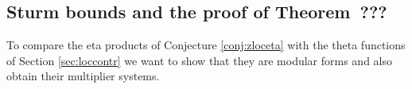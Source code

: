 \documentclass{article}
\theoremstyle{definition}
\begin{document}

\subsection{Sturm bounds and the proof of Theorem~???}
To compare the eta products of Conjecture \ref{conj:zloceta} with the theta functions of Section \ref{sec:loccontr} we want to show that they are modular forms and also obtain their multiplier systems.
\end{document}
